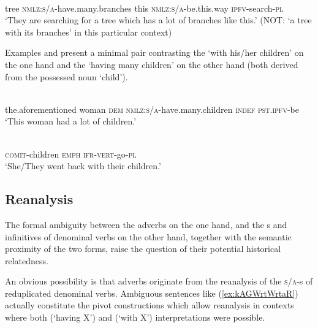 \documentclass[output=paper]{langsci/langscibook}
\begin{document}
  \begin{exe}
\ex \label{ex:kAGWrtWrtaR}
\gll   
   	 	 	 	 \\
  tree \textsc{nmlz}:\textsc{s\slash a}-have.many.branches this \textsc{nmlz}:\textsc{s\slash a}-be.this.way \textsc{ipfv}-search-\textsc{pl} \\
\glt `They are searching for a tree which has a lot of branches like this.' (NOT: `a tree with its branches' in this particular context)
\end{exe}

Examples  and  present a minimal pair contrasting the   `with his/her children' on the one hand and the   `having many children' on the other hand (both derived from the possessed noun   `child').

\begin{exe}
\ex \label{ex:kAGWrJWrJit}
\gll   
{} 	 	 	 	 	  \\
the.aforementioned woman \textsc{dem} \textsc{nmlz}:\textsc{s\slash a}-have.many.children \textsc{indef} \textsc{pst.ipfv}-be \\
\glt `This woman had a lot of children.'
\end{exe}

\begin{exe}
\ex \label{ex:kAGWrJWrJit2}
\gll   
{} 	 	 \\
\textsc{comit}-children \textsc{emph} \textsc{ifr-vert}-go-\textsc{pl} \\
\glt `She/They went back with their children.'
\end{exe}



\subsection{Reanalysis}
The formal ambiguity between the  adverbs on the one hand, and the s and infinitives of  denominal verbs on the other hand, together with the semantic proximity of the two forms, raise the question of their potential historical relatedness.

An obvious possibility is that  adverbs originate from the reanalysis of the \textsc{s\slash a}-s of reduplicated  denominal verbs. Ambiguous sentences like (\ref{ex:kAGWrtWrtaR}) actually constitute the pivot constructions which allow reanalysis in contexts where both  (`having X') and  (`with X') interpretations were possible.
\end{document}
